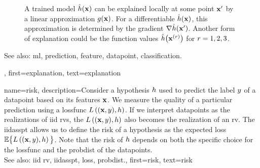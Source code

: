 {{\begin{figure}[H]
\begin{center}
	 	\end{center}
	 	\caption{A trained \gls{model} $\hat{h}({\bf x})$ can be explained 
	     	locally at some point ${\bf x}'$ by a linear approximation $g({\bf x})$. 
	     	For a \gls{differentiable} $\hat{h}({\bf x})$, this approximation is 
	     	determined by the \gls{gradient} $\nabla \hat{h}({\bf x}')$. Another 
	     	form of explanation could be the \gls{function} values $\hat{h}\big({\bf x}^{(r)} \big)$ 
	     	for $r=1, 2, 3$. 
		\label{fig_explanation_dict}}
	 	\end{figure} 
		See also: \gls{ml}, \gls{prediction}, \gls{feature}, \gls{datapoint}, \gls{classification}.},
	first={explanation},
	text={explanation} 
}

{name={risk},
	description={Consider a \gls{hypothesis} $h$ used to predict the \gls{label} 
		$y$ of a \gls{datapoint} based on its \glspl{feature} ${\bf x}$. We measure 
		the quality of a particular \gls{prediction} using a \gls{lossfunc} $L\left(({\bf x},y),h \right)$. 
		If we interpret \glspl{datapoint} as the \glspl{realization} of \gls{iid} \glspl{rv}, 
		the $L\left(({\bf x},y),h \right)$ also becomes the \gls{realization} 
		of an \gls{rv}. The \gls{iidasspt} allows us to define the risk of a \gls{hypothesis} 
		as the expected \gls{loss} $\mathbb{E} \big\{L\left(({\bf x},y),h \right) \big\}$. 
		Note that the risk of $h$ depends on both the specific choice for the \gls{lossfunc} and the 
		\gls{probdist} of the \glspl{datapoint}.
					\\ 
		See also: \gls{iid} \gls{rv}, \gls{iidasspt}, \gls{loss}, \gls{probdist}.},
	first={risk},
	text={risk} 
}

